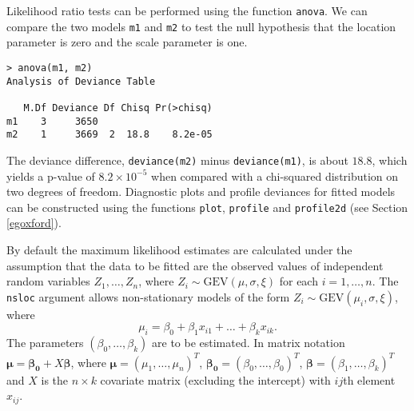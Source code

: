 \documentclass[11pt,a4paper]{article}
\begin{document}
Likelihood ratio tests can be performed using the function \verb+anova+.
We can compare the two models \verb+m1+ and \verb+m2+ to test the null hypothesis that the location parameter is zero and the scale parameter is one.
\begin{verbatim}
> anova(m1, m2)
Analysis of Deviance Table

   M.Df Deviance Df Chisq Pr(>chisq)    
m1    3     3650                        
m2    1     3669  2  18.8    8.2e-05
\end{verbatim}
The deviance difference, \verb+deviance(m2)+ minus \verb+deviance(m1)+, is about $18.8$, which yields a p-value of $8.2 \times 10^{-5}$ when compared with a chi-squared distribution on two degrees of freedom. Diagnostic plots and profile deviances for fitted models can be constructed using the functions \verb+plot+, \verb+profile+ and \verb+profile2d+ (see Section \ref{egoxford}).

By default the maximum likelihood estimates are calculated under the assumption that the data to be fitted are the observed values of independent random variables $Z_1,\dots,Z_n$, where $Z_i \sim \text{GEV}(\mu,\sigma,\xi)$ for each $i=1,\dots,n$. The \verb+nsloc+ argument allows non-stationary models of the form $Z_i \sim \text{GEV}(\mu_i,\sigma,\xi)$, where
\begin{equation*}
\mu_i = \beta_0 + \beta_1x_{i1} + \dots + \beta_kx_{ik}.
\end{equation*}
The parameters $(\beta_0,\dots,\beta_k)$ are to be estimated. In matrix notation $\boldsymbol{\mu} = \boldsymbol{\beta_0} + X \boldsymbol{\beta} $, where $ \boldsymbol{\mu}= (\mu_1,\dots,\mu_n)^T$, $\boldsymbol{\beta_0} = (\beta_0,\dots,\beta_0)^T$, $\boldsymbol{\beta} = (\beta_1,\dots,\beta_k)^T$ and $X$ is the $n \times k$ covariate matrix (excluding the intercept) with $ij$th element $x_{ij}$.
\end{document}
